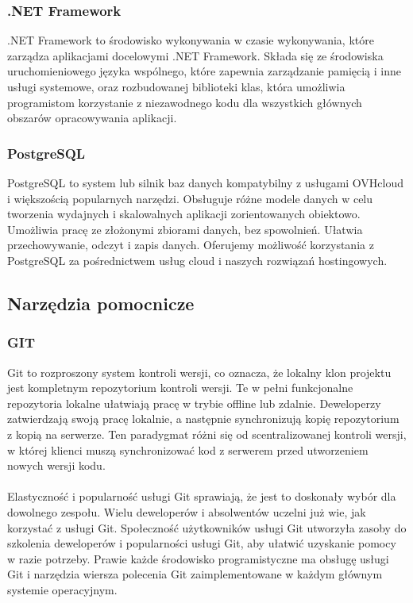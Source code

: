 \documentclass[12pt,a4paper]{article}
\begin{document}
\subsubsection{.NET Framework}
.NET Framework to środowisko wykonywania w czasie wykonywania, które zarządza aplikacjami docelowymi .NET Framework. Składa się ze środowiska uruchomieniowego języka wspólnego, które zapewnia zarządzanie pamięcią i inne usługi systemowe, oraz rozbudowanej biblioteki klas, która umożliwia programistom korzystanie z niezawodnego kodu dla wszystkich głównych obszarów opracowywania aplikacji.

\subsubsection{PostgreSQL}
PostgreSQL to system lub silnik baz danych kompatybilny z usługami OVHcloud i większością popularnych narzędzi. Obsługuje różne modele danych w celu tworzenia wydajnych i skalowalnych aplikacji zorientowanych obiektowo. Umożliwia pracę ze złożonymi zbiorami danych, bez spowolnień. Ułatwia przechowywanie, odczyt i zapis danych. Oferujemy możliwość korzystania z PostgreSQL za pośrednictwem usług cloud i naszych rozwiązań hostingowych.

\subsection{Narzędzia pomocnicze}

\subsubsection{GIT}
Git to rozproszony system kontroli wersji, co oznacza, że lokalny klon projektu jest kompletnym repozytorium kontroli wersji. Te w pełni funkcjonalne repozytoria lokalne ułatwiają pracę w trybie offline lub zdalnie. Deweloperzy zatwierdzają swoją pracę lokalnie, a następnie synchronizują kopię repozytorium z kopią na serwerze. Ten paradygmat różni się od scentralizowanej kontroli wersji, w której klienci muszą synchronizować kod z serwerem przed utworzeniem nowych wersji kodu.
\\\\
Elastyczność i popularność usługi Git sprawiają, że jest to doskonały wybór dla dowolnego zespołu. Wielu deweloperów i absolwentów uczelni już wie, jak korzystać z usługi Git. Społeczność użytkowników usługi Git utworzyła zasoby do szkolenia deweloperów i popularności usługi Git, aby ułatwić uzyskanie pomocy w razie potrzeby. Prawie każde środowisko programistyczne ma obsługę usługi Git i narzędzia wiersza polecenia Git zaimplementowane w każdym głównym systemie operacyjnym.
\end{document}
